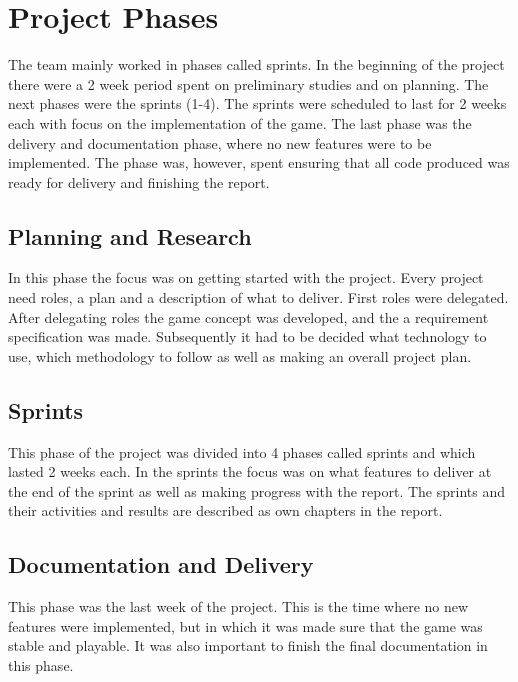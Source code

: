 \clearpage
\section{Project Phases}

The team mainly worked in phases called sprints. In the beginning of the project there were a 2 week period spent on preliminary studies and on planning. The next phases were the sprints (1-4). The sprints were scheduled to last for 2 weeks each with focus on the implementation of the game. The last phase was the delivery and documentation phase, where no new features were to be implemented. The phase was, however, spent ensuring that all code produced was ready for delivery and finishing the report.

\subsection{Planning and Research}
In this phase the focus was on getting started with the project. Every project need roles, a plan and a description of what to deliver. First roles were delegated. After delegating roles the game concept was developed, and the a requirement specification was made. Subsequently it had to be decided what technology to use, which methodology to follow as well as making an overall project plan. 

\subsection{Sprints}
This phase of the project was divided into 4 phases called sprints and which lasted 2 weeks each. In the sprints the focus was on what features to deliver at the end of the sprint as well as making progress with the report. The sprints and their activities and results are described as own chapters in the report.

\subsection{Documentation and Delivery}
This phase was the last week of the project. This is the time where no new features were implemented, but in which it was  made sure that the game was stable and playable. It was also important to finish the final documentation in this phase.
